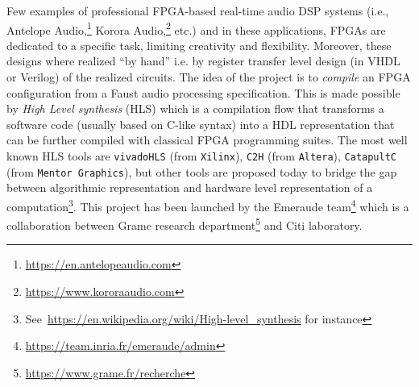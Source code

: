 
Few examples of professional FPGA-based real-time audio DSP systems (i.e., Antelope Audio,\footnote{\url{https://en.antelopeaudio.com}} Korora Audio,\footnote{\url{https://www.kororaaudio.com}} etc.) and in these applications, FPGAs are dedicated to a specific task, limiting creativity and flexibility. Moreover, these designs where realized ``by hand'' i.e. by register transfer level design (in VHDL or Verilog) of the realized circuits. The idea of the \syfala project is to {\em compile} an FPGA configuration from a Faust audio processing specification. This is made possible by {\em High Level synthesis} (HLS) which is a compilation flow that transforms a software code (usually based on C-like syntax) into a HDL representation that can be further compiled with classical FPGA programming suites. The most well known HLS tools are {\tt vivadoHLS} (from {\tt Xilinx}), {\tt C2H} (from {\tt Altera}), {\tt CatapultC} (from {\tt Mentor Graphics}), but other tools are proposed today to bridge the gap between algorithmic representation and hardware level representation of a computation\footnote{See~\url{https://en.wikipedia.org/wiki/High-level_synthesis} for instance}. 
This project has been launched by the Emeraude team\footnote{\url{https://team.inria.fr/emeraude/admin}} which is  a collaboration between Grame research department\footnote{\url{https://www.grame.fr/recherche}} and Citi laboratory.
